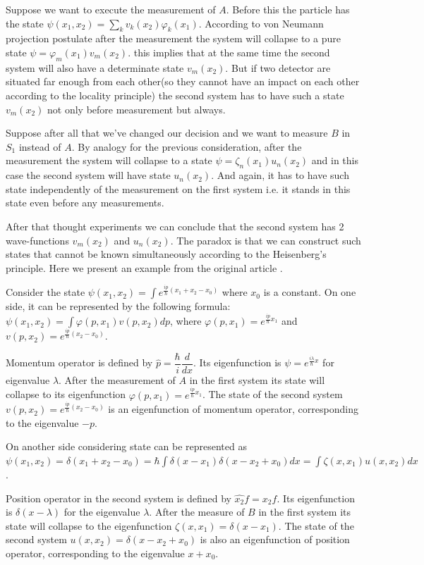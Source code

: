 \documentclass[11pt]{article}
\begin{document}
Suppose we want to execute the measurement of $A$. Before this the particle has the state $\psi(x_1, x_2) = \sum_k v_k(x_2)\varphi_k(x_1)$. According to von Neumann projection postulate after the measurement the system will collapse to a pure state $\psi = \varphi_m(x_1)v_m(x_2)$.  this implies that at the same time the second system will also have a determinate state $v_m(x_2)$. But if two detector are situated far enough from each other(so they cannot have an impact on each other according to the locality principle) the second system has to have such a state $v_m(x_2)$ not only before measurement but always.

Suppose after all that we've changed our decision and we want to measure $B$ in $S_1$ instead of $A$. By analogy for the previous consideration, after the measurement the system will collapse to a state $\psi = \zeta_n(x_1)u_n(x_2)$ and in this case the second system will have state $u_n(x_2)$. And again, it has to have such state independently of the measurement on the first system i.e. it stands in this state even before any measurements.

After that thought experiments we can conclude that the second system has 2 wave-functions $v_m(x_2)$ and $u_n(x_2)$. The paradox is that we can construct such states that cannot be known simultaneously according to the Heisenberg's principle. Here we present an example from the original article \cite{EPR}.

Consider the state $\psi(x_1, x_2) = \int e^{\frac{ip}{\hbar}(x_1+x_2-x_0)}$ where $x_0$ is a constant. On one side, it can be represented by the following formula: $\psi(x_1, x_2) = \int\varphi(p, x_1)v(p, x_2)dp$, where $\varphi(p, x_1) = e^{\frac{ip}{\hbar}x_1}$ and $v(p, x_2) = e^{\frac{ip}{\hbar}(x_2-x_0)}$. 

Momentum operator is defined by $\hat{p} = \dfrac{\hbar}{i}\dfrac{d}{dx}$. Its eigenfunction is $\psi = e^{\frac{i\lambda}{\hbar}x}$ for eigenvalue $\lambda$. After the measurement of $A$ in the first system its state will collapse to its eigenfunction $\varphi(p, x_1) = e^{\frac{ip}{\hbar}x_1}$. The state of the second system $v(p, x_2) = e^{\frac{ip}{\hbar}(x_2-x_0)}$ is an eigenfunction of momentum operator, corresponding to the eigenvalue $-p$. 

On another side considering state can be represented as $\psi(x_1, x_2) = \delta(x_1 + x_2 - x_0) = \hbar\int\delta(x - x_1)\delta (x - x_2 + x_0)dx = \int\zeta(x, x_1)u(x, x_2)dx$. 

Position operator in the second system is defined by $\hat{x_2}f = x_2f$. Its eigenfunction is $\delta(x - \lambda)$ for the eigenvalue $\lambda$. After the measure of $B$ in the first system its state will collapse to the eigenfunction $\zeta(x, x_1) = \delta(x - x_1)$. The state of the second system $u(x, x_2) = \delta(x - x_2 + x_0)$ is also an eigenfunction of position operator, corresponding to the eigenvalue $x + x_0$.
\end{document}
